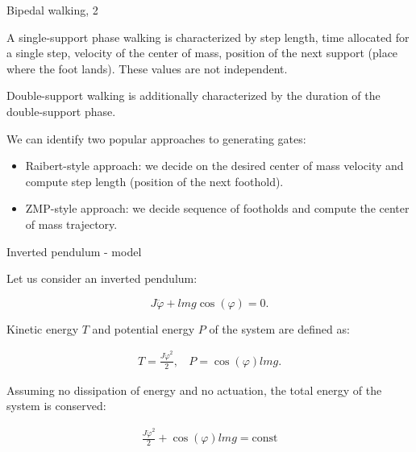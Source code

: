 \documentclass{beamer}
\begin{document}
\begin{frame}{Bipedal walking, 2}
	\begin{flushleft}
		
		A single-support phase walking is characterized by step length, time allocated for a single step, velocity of the center of mass, position of the next support (place where the foot lands). These values are not independent.
		
		\bigskip
		
		Double-support walking is additionally characterized by the duration of the double-support phase.
		
		\bigskip
		
		We can identify two popular approaches to generating gates:
		
		\begin{itemize}
			\item Raibert-style approach: we decide on the desired center of mass velocity and compute step length (position of the next foothold).
			
			\item ZMP-style approach: we decide sequence of footholds and compute the center of mass trajectory.
		\end{itemize}
		
		
	\end{flushleft}
\end{frame}




\begin{frame}{Inverted pendulum - model}
	\begin{flushleft}
		
		Let us consider an inverted pendulum:
		
		\begin{equation}
			J \ddot \varphi + lmg \cos(\varphi) = 0.
		\end{equation}
		
		Kinetic energy $T$ and potential energy $P$ of the system are defined as:
		
		\begin{align}
			T = \frac{J \dot \varphi^2}{2}, \ \ \ \ P =  \cos(\varphi) lmg.
		\end{align}
		
		Assuming no dissipation of energy and no actuation, the total energy of the system is conserved:
		
		\begin{align}
			\frac{J \dot \varphi^2}{2} + \cos(\varphi) lmg = \text{const}
		\end{align}
		
		
		
	\end{flushleft}
\end{frame}
\end{document}
